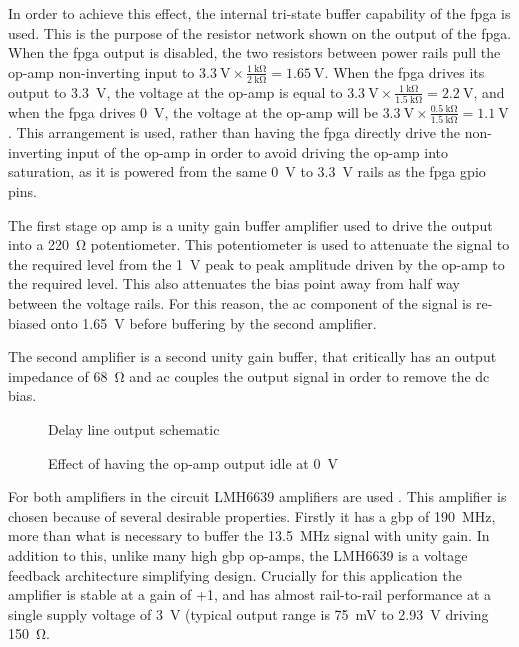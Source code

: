 In order to achieve this effect, the internal tri-state buffer capability of the \gls{fpga} is used. This is the purpose of the resistor network shown on the output of the \gls{fpga}. When the \gls{fpga} output is disabled, the two resistors between power rails pull the op-amp non-inverting input to $\SI{3.3}{\volt} \times\frac{\SI{1}{\kilo\ohm}}{\SI{2}{\kilo\ohm}} = \SI{1.65}{\volt}$. When the \gls{fpga} drives its output to \SI{3.3}{\volt}, the voltage at the op-amp is equal to $\SI{3.3}{\volt} \times\frac{\SI{1}{\kilo\ohm}}{\SI{1.5}{\kilo\ohm}} = \SI{2.2}{\volt}$, and when the \gls{fpga} drives \SI{0}{\volt}, the voltage at the op-amp will be $\SI{3.3}{\volt} \times\frac{\SI{0.5}{\kilo\ohm}}{\SI{1.5}{\kilo\ohm}} = \SI{1.1}{\volt}$. This arrangement is used, rather than having the \gls{fpga} directly drive the non-inverting input of the op-amp in order to avoid driving the op-amp into saturation, as it is powered from the same \SI{0}{\volt} to \SI{3.3}{\volt} rails as the \gls{fpga} \gls{gpio} pins.

The first stage op amp is a unity gain buffer amplifier used to drive the output into a \SI{220}{\ohm} potentiometer. This potentiometer is used to attenuate the signal to the required level from the \SI{1}{\volt} peak to peak amplitude driven by the op-amp to the required level. This also attenuates the bias point away from half way between the voltage rails. For this reason, the \gls{ac} component of the signal is re-biased onto \SI{1.65}{\volt} before buffering by the second amplifier.

The second amplifier is a second unity gain buffer, that critically has an output impedance of \SI{68}{\ohm} and \gls{ac} couples the output signal in order to remove the \gls{dc} bias.

\begin{figure}[ht]
	\centering
	\caption{Delay line output schematic }
	\label{fig:delay-line-output-sch}
\end{figure}

\begin{figure}[ht]
	\centering
	\dummyfigure
	\caption{Effect of having the op-amp output idle at \SI{0}{\volt}}
	\label{fig:delay-line-output-coupling}
\end{figure}

For both amplifiers in the circuit LMH6639 amplifiers are used \cite{ti2013}. This amplifier is chosen because of several desirable properties. Firstly it has a \gls{gbp} of \SI{190}{\mega\hertz}, more than what is necessary to buffer the \SI{13.5}{\mega\hertz} signal with unity gain. In addition to this, unlike many high \gls{gbp} op-amps, the LMH6639 is a voltage feedback architecture simplifying design. Crucially for this application the amplifier is stable at a gain of +1, and has almost rail-to-rail performance at a single supply voltage of \SI{3}{\volt} (typical output range is \SI{75}{\milli\volt} to \SI{2.93}{\volt} driving \SI{150}{\ohm}.

